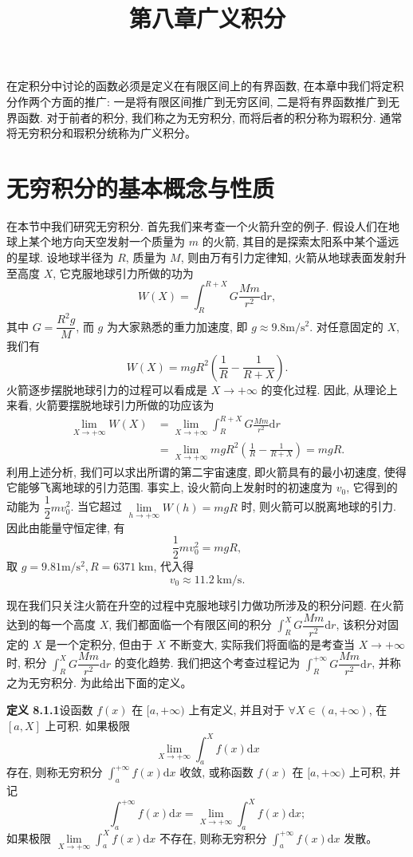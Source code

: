 \documentclass[UTF8, 12pt, fontset=fandol, oneside]{ctexart}
\title{第八章\quad 广义积分}
\author{}
\date{}
\begin{document}
\maketitle

在定积分中讨论的函数必须是定义在有限区间上的有界函数, 在本章中我们将定积分作两个方面的推广: 一是将有限区间推广到无穷区间, 二是将有界函数推广到无界函数. 对于前者的积分, 我们称之为无穷积分, 而将后者的积分称为瑕积分. 通常将无穷积分和瑕积分统称为广义积分。

\section{无穷积分的基本概念与性质}

在本节中我们研究无穷积分. 首先我们来考查一个火箭升空的例子. 假设人们在地球上某个地方向天空发射一个质量为 $m$ 的火箭, 其目的是探索太阳系中某个遥远的星球. 设地球半径为 $R$, 质量为 $M$, 则由万有引力定律知, 火箭从地球表面发射升至高度 $X$, 它克服地球引力所做的功为
\[
  W(X)=\int_R^{R+X}G\frac{Mm}{r^2}\mathrm dr,
\]
其中 $G=\dfrac{R^2g}{M}$, 而 $g$ 为大家熟悉的重力加速度, 即 $g\approx9.8\mathrm{m}/\mathrm{s}^2$. 对任意固定的 $X$, 我们有
\[
  W(X)=mgR^2\left(\frac1R-\frac1{R+X}\right).
\]
火箭逐步摆脱地球引力的过程可以看成是 $X\to+\infty$ 的变化过程. 因此, 从理论上来看, 火箭要摆脱地球引力所做的功应该为
\[
\begin{aligned}
  \lim_{X\to+\infty}W(X)
  &=\lim_{X\to+\infty}\int_R^{R+X}G\frac{Mm}{r^2}\mathrm dr\\
  &=\lim_{X\to+\infty}mgR^2\left(\frac1R-\frac1{R+X}\right)=mgR.
\end{aligned}
\]
利用上述分析, 我们可以求出所谓的第二宇宙速度, 即火箭具有的最小初速度, 使得它能够飞离地球的引力范围. 事实上, 设火箭向上发射时的初速度为 $v_0$, 它得到的动能为 $\dfrac12mv_0^2$. 当它超过 $\lim\limits_{h\to+\infty}W(h)=mgR$ 时, 则火箭可以脱离地球的引力. 因此由能量守恒定律, 有
\[
  \frac12mv_0^2=mgR,
\]
取 $g=9.81\mathrm{m}/\mathrm{s}^2,R=6371\ \mathrm{km}$, 代入得
\[
  v_0\approx11.2\ \mathrm{km}/\mathrm{s}.
\]

现在我们只关注火箭在升空的过程中克服地球引力做功所涉及的积分问题. 在火箭达到的每一个高度 $X$, 我们都面临一个有限区间的积分 $\int_R^X G\dfrac{Mm}{r^2}\mathrm dr$, 该积分对固定的 $X$ 是一个定积分, 但由于 $X$ 不断变大, 实际我们将面临的是考查当 $X\to+\infty$ 时, 积分 $\int_R^X G\dfrac{Mm}{r^2}\mathrm dr$ 的变化趋势. 我们把这个考查过程记为 $\int_R^{+\infty}G\dfrac{Mm}{r^2}\mathrm dr$, 并称之为无穷积分. 为此给出下面的定义。

\noindent\textbf{定义 8.1.1}\quad 设函数 $f(x)$ 在 $[a,+\infty)$ 上有定义, 并且对于 $\forall X\in(a,+\infty)$, 在 $[a,X]$ 上可积. 如果极限
\[
  \lim_{X\to+\infty}\int_a^X f(x)\mathrm dx
\]
存在, 则称无穷积分 $\int_a^{+\infty}f(x)\mathrm dx$ 收敛, 或称函数 $f(x)$ 在 $[a,+\infty)$ 上可积, 并记
\[
  \int_a^{+\infty}f(x)\mathrm dx=\lim_{X\to+\infty}\int_a^X f(x)\mathrm dx;
\]
如果极限 $\lim\limits_{X\to+\infty}\int_a^X f(x)\mathrm dx$ 不存在, 则称无穷积分 $\int_a^{+\infty}f(x)\mathrm dx$ 发散。
\end{document}
